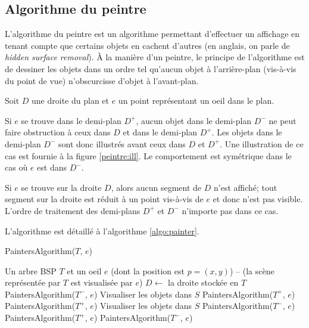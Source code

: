 \subsection{Algorithme du peintre}
L'algorithme du peintre est un algorithme permettant d'effectuer un
affichage en tenant compte que certains objets en cachent d'autres
(en anglais, on parle de \emph{hidden surface removal}).
\`{A} la manière d'un peintre,
le principe de l'algorithme est
de dessiner les objets dans un ordre tel qu'aucun objet à l'arrière-plan
(vis-à-vis du point de vue) n'obscurcisse d'objet à l'avant-plan.

Soit $D$ une droite du plan et $e$ un point représentant un oeil dans
le plan.

Si $e$ se trouve dans le demi-plan $D^+$, aucun objet dans le
demi-plan $D^-$ ne peut faire obstruction à ceux dans $D$ et dans le
demi-plan $D^+$. Les objets dans le demi-plan $D^-$ sont donc
\og{}illustrés\fg{} avant ceux dans $D$ et $D^+$.
Une illustration de ce cas est fournie à la figure \ref{peintre:ill}.
Le comportement est symétrique dans le cas où $e$ est dans $D^-$.



Si $e$ se trouve sur la droite $D$, alors aucun segment de $D$ n'est affiché;
tout segment sur la droite est réduit à un point vis-à-vis de $e$ et donc n'est
pas visible. L'ordre de traitement des demi-plans $D^+$ et $D^-$ n'importe
pas dans ce cas.

L'algorithme est détaillé à l'algorithme \ref{algo:painter}.

\begin{algorithm}
  \caption{PaintersAlgorithm($T$, $e$)}
  \begin{algorithmic}[1] \label{algo:painter}
    \REQUIRE Un arbre BSP $T$ et un oeil $e$ (dont la position est $p=(x, y)$)
    \ENSURE -- (la scène représentée par $T$ est visualisée par $e$)
    \STATE $D\leftarrow$ la droite stockée en $T$
    \STATE PaintersAlgorithm($T^-$, $e$)
    \STATE Visualiser les objets dans $S$
    \STATE PaintersAlgorithm($T^+$, $e$)
    \STATE PaintersAlgorithm($T^+$, $e$)
    \STATE Visualiser les objets dans $S$
    \STATE PaintersAlgorithm($T^-$, $e$)
    \ELSE
    \STATE PaintersAlgorithm($T^+$, $e$)
    \STATE PaintersAlgorithm($T^-$, $e$)
    \ENDIF
    \ENDIF
  \end{algorithmic}
\end{algorithm}


